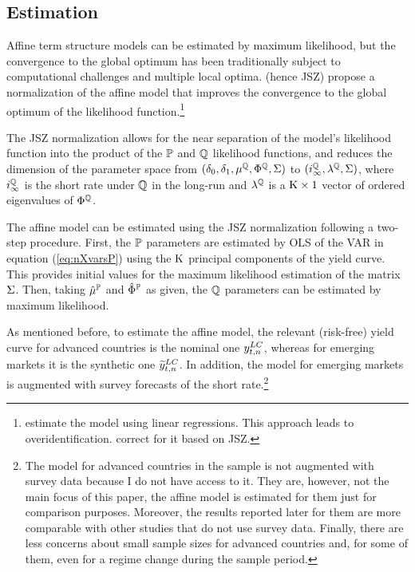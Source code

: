 {\subsection{Estimation} \label{sec:Estimation}
\iftoggle{toclinks}{\gototoc}{} %
Affine term structure models can be estimated by maximum likelihood, but the convergence to the global optimum has been traditionally subject to computational challenges and multiple local optima.
\citet*{JSZ:2011} (hence JSZ) propose a normalization of the affine model that improves the convergence to the global optimum of the likelihood function.\footnote{ \cite{ACM:2013} estimate the model using linear regressions. This approach leads to overidentification. \cite{GolinskiSpencer:2019} correct for it based on JSZ.} 

The JSZ normalization allows for the near separation of the model's likelihood function into the product of the \(\mathbb{P}\) and \(\mathbb{Q}\) likelihood functions, and reduces the dimension of the parameter space from \((\delta_{0}, \delta_{1}, \mu^{\mathbb{Q}}, \Phi^{\mathbb{Q}}, \Sigma)\) to \((i^{\mathbb{Q}}_{\infty}, \lambda^{\mathbb{Q}},\Sigma)\), where \(i^{\mathbb{Q}}_{\infty}\) is the short rate under \(\mathbb{Q}\) in the long-run and \(\lambda^{\mathbb{Q}}\) is a \(\mathrm{K} \times 1\) vector of ordered eigenvalues of \(\Phi^{\mathbb{Q}}\).

The affine model can be estimated using the JSZ normalization following a two-step procedure. 
First, the \(\mathbb{P}\) parameters are estimated by OLS of the VAR in equation (\ref{eq:nXvarsP}) using the \(\mathrm{K}\) principal components of the yield curve. This provides initial values for the maximum likelihood estimation of the matrix \(\Sigma\). Then, taking \(\hat{\mu}^{\mathbb{P}}\) and \(\hat{\Phi}^{\mathbb{P}}\) as given, the \(\mathbb{Q}\) parameters can be estimated by maximum likelihood. 

As mentioned before, to estimate the affine model, the relevant (risk-free) yield curve for advanced countries is the nominal one \(y_{t,n} ^{LC}\), whereas for emerging markets it is the synthetic one \(\widetilde{y}_{t,n} ^{LC}\).
In addition, the model for emerging markets is augmented with survey forecasts of the short rate.\footnote{ The model for advanced countries in the sample is not augmented with survey data because I do not have access to it. They are, however, not the main focus of this paper, the affine model is estimated for them just for comparison purposes. Moreover, the results reported later for them are more comparable with other studies that do not use survey data. Finally, there are less concerns about small sample sizes for advanced countries and, for some of them, even for a regime change during the sample period.} 

}
